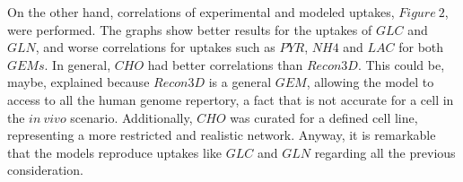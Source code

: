 	
	On the other hand, correlations of experimental and modeled uptakes, $Figure\ 2$, were performed. The graphs show better results for the uptakes of $GLC$ and $GLN$, 
	and worse correlations for uptakes such as $PYR$, $NH4$ and $LAC$ for both $GEMs$. In general, $CHO$ had better correlations than $Recon3D$. This could be, maybe, explained because $Recon3D$ is a general $GEM$, allowing the model to access to all the human genome repertory, a fact that is not accurate for a cell in the $in\ vivo$ scenario. Additionally, $CHO$ was curated for a defined cell line, representing a more restricted and realistic network. Anyway, it is remarkable that the models reproduce uptakes like $GLC$ and $GLN$ regarding all the previous consideration.